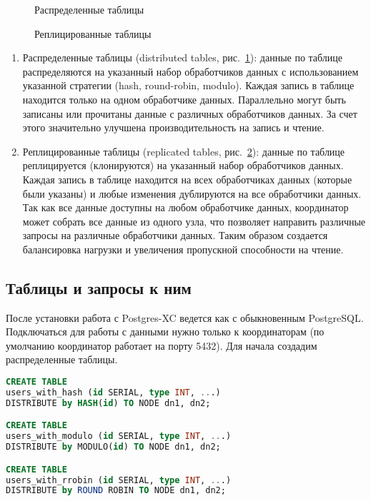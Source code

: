 \begin{figure}[ht!]
  \caption{Распределенные таблицы}
  \label{fig:postgres-xc2}
\end{figure}

\begin{figure}[ht!]
  \caption{Реплицированные таблицы}
  \label{fig:postgres-xc3}
\end{figure}

\begin{enumerate}
  \item Распределенные таблицы (distributed tables, рис.~\ref{fig:postgres-xc2}): данные по таблице распределяются на указанный набор обработчиков данных с использованием указанной стратегии (hash, round-robin, modulo). Каждая запись в таблице находится только на одном обработчике данных. Параллельно могут быть записаны или прочитаны данные с различных обработчиков данных. За счет этого значительно улучшена производительность на запись и чтение.
  \item Реплицированные таблицы (replicated tables, рис.~\ref{fig:postgres-xc3}): данные по таблице реплицируется (клонируются) на указанный набор обработчиков данных. Каждая запись в таблице находится на всех обработчиках данных (которые были указаны) и любые изменения дублируются на все обработчики данных. Так как все данные доступны на любом обработчике данных, координатор может собрать все данные из одного узла, что позволяет направить различные запросы на различные обработчики данных. Таким образом создается балансировка нагрузки и увеличения пропускной способности на чтение.
\end{enumerate}

\subsection{Таблицы и запросы к ним}

После установки работа с Postgres-XC ведется как с обыкновенным PostgreSQL. Подключаться для работы с данными нужно только к координаторам (по умолчанию координатор работает на порту 5432). Для начала создадим распределенные таблицы.

\begin{lstlisting}[language=SQL,label=lst:postgres-xc2,caption=Создание распределенных таблиц]
CREATE TABLE
users_with_hash (id SERIAL, type INT, ...)
DISTRIBUTE by HASH(id) TO NODE dn1, dn2;

CREATE TABLE
users_with_modulo (id SERIAL, type INT, ...)
DISTRIBUTE by MODULO(id) TO NODE dn1, dn2;

CREATE TABLE
users_with_rrobin (id SERIAL, type INT, ...)
DISTRIBUTE by ROUND ROBIN TO NODE dn1, dn2;
\end{lstlisting}


